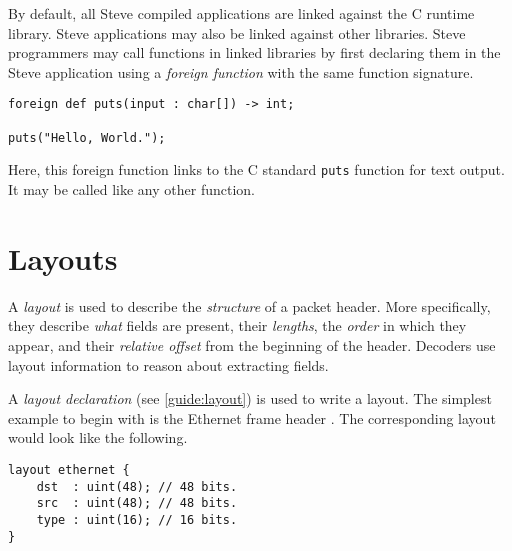 By default, all Steve compiled applications are linked against the C runtime
library. Steve applications may also be linked against other libraries.
Steve programmers may call functions in linked libraries by first declaring
them in the Steve application using a \emph{foreign function} with the same
function signature.

\begin{codepage}
\begin{lstlisting}
foreign def puts(input : char[]) -> int;

puts("Hello, World.");
\end{lstlisting}
\end{codepage}

Here, this foreign function links to the C standard \texttt{puts} function
for text output. It may be called like any other function.

\section{Layouts} \label{tut:layout}

A \textit{layout} is used to describe 
the \textit{structure} of a packet header.
More specifically, they describe \textit{what} fields are present, their
\textit{lengths}, the \textit{order} in which they appear, and their
\textit{relative offset} from the beginning of the header. 
Decoders use layout information to reason about extracting fields.


A \emph{layout declaration} (see \ref{guide:layout}) is used to write a layout.
The simplest example to begin with is the Ethernet frame header \cite{eth_std}.
The corresponding layout would look like the following.  

\begin{codepage}
\begin{lstlisting}
layout ethernet {
	dst  : uint(48); // 48 bits.
	src  : uint(48); // 48 bits.
	type : uint(16); // 16 bits.
}
\end{lstlisting}
\end{codepage}

